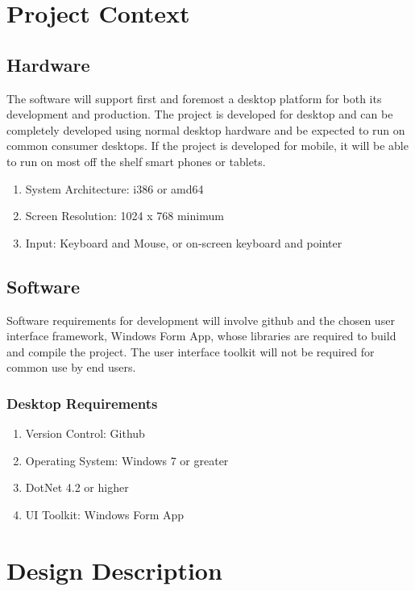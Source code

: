 \documentclass[onecolumn, draftclsnofoot,10pt, compsoc]{IEEEtran}
\begin{document}
\section{Project Context}
\subsection{Hardware}
The software will support first and foremost a desktop platform for both its development and production.
The project is developed for desktop and can be completely developed using normal desktop hardware and be expected to run on common consumer desktops.
If the project is developed for mobile, it will be able to run on most off the shelf smart phones or tablets.
\begin{enumerate}
    \item System Architecture: i386 or amd64
    \item Screen Resolution: 1024 x 768 minimum
    \item Input: Keyboard and Mouse, or on-screen keyboard and pointer
\end{enumerate}
\subsection{Software}
Software requirements for development will involve github and the chosen user interface framework, Windows Form App, whose libraries are required to build and compile the project.
The user interface toolkit will not be required for common use by end users.
\subsubsection{Desktop Requirements}
\begin{enumerate}
    \item Version Control: Github
    \item Operating System: Windows 7 or greater
    \item DotNet 4.2 or higher
    \item UI Toolkit: Windows Form App
\end{enumerate}

\section{Design Description}
\end{document}

